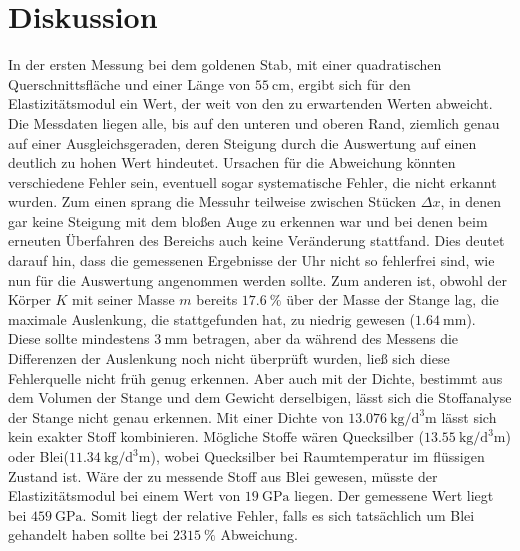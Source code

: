 \section{Diskussion}
\label{sec:Diskussion}

In der ersten Messung bei dem goldenen Stab, mit einer quadratischen Querschnittsfläche und einer Länge von $\SI{55}{\centi\meter}$, ergibt sich für den Elastizitätsmodul ein Wert, der weit von den zu erwartenden Werten abweicht. Die Messdaten liegen alle, bis auf den unteren und oberen Rand, ziemlich genau auf einer Ausgleichsgeraden, deren Steigung durch die Auswertung auf einen deutlich zu hohen Wert hindeutet. Ursachen für die Abweichung könnten verschiedene Fehler sein, eventuell sogar systematische Fehler, die nicht erkannt wurden. Zum einen sprang die Messuhr teilweise zwischen Stücken $ \Delta x$, in denen gar keine Steigung mit dem bloßen Auge zu erkennen war und bei denen beim erneuten Überfahren des Bereichs auch keine Veränderung stattfand. Dies deutet darauf hin, dass die gemessenen Ergebnisse der Uhr nicht so fehlerfrei sind, wie nun für die Auswertung angenommen werden sollte. 
Zum anderen ist, obwohl der Körper $K$ mit seiner Masse $m$ bereits $\SI{17.6}{\percent}$ über der Masse der Stange lag, die maximale Auslenkung, die stattgefunden hat, zu niedrig gewesen ($\SI{1.64}{\milli\meter}$). Diese sollte mindestens $\SI{3}{\milli\meter}$ betragen, aber da während des Messens die Differenzen der Auslenkung noch nicht überprüft wurden, ließ sich diese Fehlerquelle nicht früh genug erkennen. 
Aber auch mit der Dichte, bestimmt aus dem Volumen der Stange und dem Gewicht derselbigen, lässt sich die Stoffanalyse der Stange nicht genau erkennen. Mit einer Dichte von $\SI{13,076}{\kilo\gram\per\cubic\deci\meter}$ lässt sich kein exakter Stoff kombinieren. Mögliche Stoffe wären Quecksilber ($\SI{13,55}{\kilo\gram\per\cubic\deci\meter}$) oder Blei($\SI{11,34}{\kilo\gram\per\cubic\deci\meter}$), wobei Quecksilber bei Raumtemperatur im flüssigen Zustand ist. Wäre der zu messende Stoff aus Blei gewesen, müsste der Elastizitätsmodul bei einem Wert von $\SI{19}{\giga\pascal}$ liegen. Der gemessene Wert liegt bei $\SI{459}{\giga\pascal}$. Somit liegt der relative Fehler, falls es sich tatsächlich um Blei gehandelt haben sollte bei $\SI{2315}{\percent}$ Abweichung. 
\noindent

